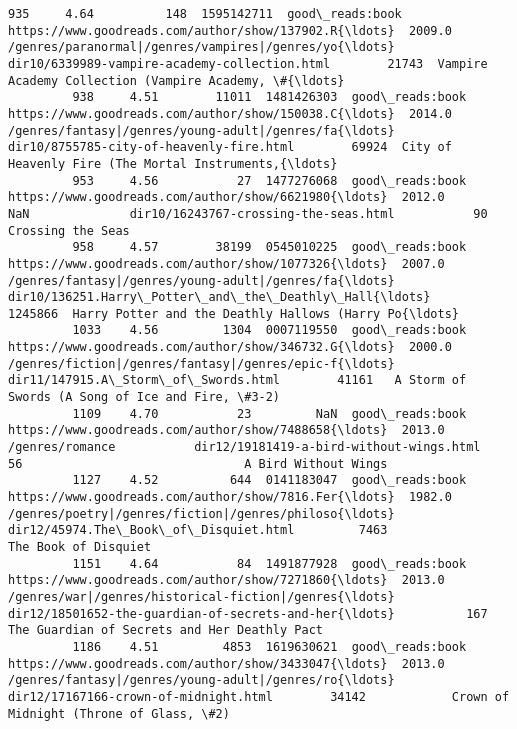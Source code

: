 \documentclass[11pt]{article}
\begin{document}
\begin{Verbatim}[commandchars=\\\{\}]
         935     4.64          148  1595142711  good\_reads:book  https://www.goodreads.com/author/show/137902.R{\ldots}  2009.0  /genres/paranormal|/genres/vampires|/genres/yo{\ldots}      dir10/6339989-vampire-academy-collection.html        21743  Vampire Academy Collection (Vampire Academy, \#{\ldots}
         938     4.51        11011  1481426303  good\_reads:book  https://www.goodreads.com/author/show/150038.C{\ldots}  2014.0  /genres/fantasy|/genres/young-adult|/genres/fa{\ldots}           dir10/8755785-city-of-heavenly-fire.html        69924  City of Heavenly Fire (The Mortal Instruments,{\ldots}
         953     4.56           27  1477276068  good\_reads:book  https://www.goodreads.com/author/show/6621980{\ldots}  2012.0                                                NaN              dir10/16243767-crossing-the-seas.html           90                                  Crossing the Seas
         958     4.57        38199  0545010225  good\_reads:book  https://www.goodreads.com/author/show/1077326{\ldots}  2007.0  /genres/fantasy|/genres/young-adult|/genres/fa{\ldots}  dir10/136251.Harry\_Potter\_and\_the\_Deathly\_Hall{\ldots}      1245866  Harry Potter and the Deathly Hallows (Harry Po{\ldots}
         1033    4.56         1304  0007119550  good\_reads:book  https://www.goodreads.com/author/show/346732.G{\ldots}  2000.0  /genres/fiction|/genres/fantasy|/genres/epic-f{\ldots}                dir11/147915.A\_Storm\_of\_Swords.html        41161   A Storm of Swords (A Song of Ice and Fire, \#3-2)
         1109    4.70           23         NaN  good\_reads:book  https://www.goodreads.com/author/show/7488658{\ldots}  2013.0                                    /genres/romance           dir12/19181419-a-bird-without-wings.html           56                               A Bird Without Wings
         1127    4.52          644  0141183047  good\_reads:book  https://www.goodreads.com/author/show/7816.Fer{\ldots}  1982.0  /genres/poetry|/genres/fiction|/genres/philoso{\ldots}              dir12/45974.The\_Book\_of\_Disquiet.html         7463                               The Book of Disquiet
         1151    4.64           84  1491877928  good\_reads:book  https://www.goodreads.com/author/show/7271860{\ldots}  2013.0  /genres/war|/genres/historical-fiction|/genres{\ldots}  dir12/18501652-the-guardian-of-secrets-and-her{\ldots}          167       The Guardian of Secrets and Her Deathly Pact
         1186    4.51         4853  1619630621  good\_reads:book  https://www.goodreads.com/author/show/3433047{\ldots}  2013.0  /genres/fantasy|/genres/young-adult|/genres/ro{\ldots}              dir12/17167166-crown-of-midnight.html        34142            Crown of Midnight (Throne of Glass, \#2)

\end{Verbatim}
\end{document}
